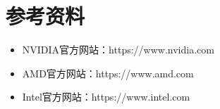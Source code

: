 \documentclass[12pt,UTF8]{ctexbook}
\begin{document}
\chapter{参考资料}

\begin{itemize}[leftmargin=2em]
    \item NVIDIA官方网站：https://www.nvidia.com
    \item AMD官方网站：https://www.amd.com
    \item Intel官方网站：https://www.intel.com
\end{itemize}

\backmatter
\end{document}
